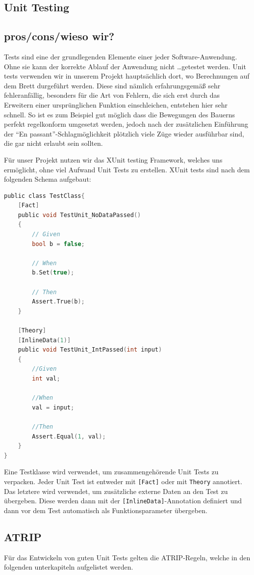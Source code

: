\documentclass[
10pt, %
a4paper, %
oneside, %
headinclude,footinclude, %
BCOR5mm, %
]{scrartcl}
\begin{document}
\begin{onehalfspace}
\section{Unit Testing}
\subsection{pros/cons/wieso wir?}
Tests sind eine der grundlegenden Elemente einer jeder Software-Anwendung. Ohne sie kann der korrekte Ablauf der Anwendung nicht \dots getestet werden. Unit tests verwenden wir in unserem Projekt hauptsächlich dort, wo Berechnungen auf dem Brett durgeführt werden. Diese sind nämlich erfahrungsgemäß sehr fehleranfällig, besonders für die Art von Fehlern, die sich erst durch das Erweitern einer ursprünglichen Funktion einschleichen, entstehen hier sehr schnell. So ist es zum Beispiel gut möglich dass die Bewegungen des Bauerns perfekt regelkonform umgesetzt werden, jedoch nach der zusätzlichen Einführung der \enquote{En passant}-Schlagmöglichkeit plötzlich viele Züge wieder ausführbar sind, die gar nicht erlaubt sein sollten.

Für unser Projekt nutzen wir das XUnit testing Framework, welches uns ermöglicht, ohne viel Aufwand Unit Tests zu erstellen.
XUnit tests sind nach dem folgenden Schema aufgebaut:
\begin{lstlisting}[language=c, style=mStyle]
public class TestClass{
	[Fact]
	public void TestUnit_NoDataPassed()
	{
		// Given
		bool b = false;

		// When
		b.Set(true);

		// Then
		Assert.True(b);
	}

	[Theory]
	[InlineData(1)]
	public void TestUnit_IntPassed(int input)
	{
		//Given
		int val;

		//When
		val = input;

		//Then
		Assert.Equal(1, val);
	}
}
\end{lstlisting}

Eine Testklasse wird verwendet, um zusammengehörende Unit Tests zu verpacken. Jeder Unit Test ist entweder mit \texttt{[Fact]} oder mit \texttt{Theory} annotiert. Das letztere wird verwendet, um zusätzliche externe Daten an den Test zu übergeben. Diese werden dann mit der \texttt{[InlineData]}-Annotation definiert und dann vor dem Test automatisch als Funktionsparameter übergeben.
\subsection{ATRIP}
Für das Entwickeln von guten Unit Tests gelten die ATRIP-Regeln, welche in den folgenden unterkapiteln aufgelistet werden.

\end{onehalfspace}
\end{document}
